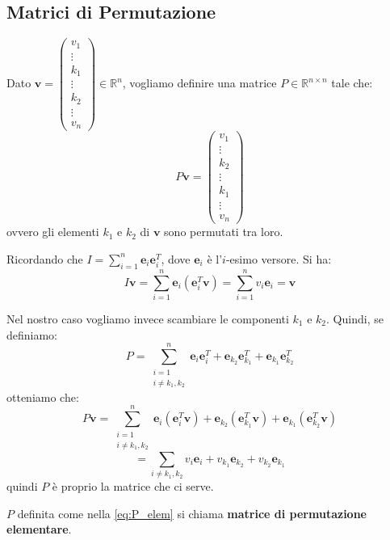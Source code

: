 \subsection{Matrici di Permutazione}
Dato $\mathbf{v} = \begin{pmatrix} v_1 \\ \vdots \\ k_1 \\ \vdots \\ k_2 \\ \vdots \\ v_n \end{pmatrix} \in \mathbb{R}^n$, vogliamo definire una matrice $P \in \mathbb{R}^{n \times n}$ tale che:
$$ P \mathbf{v} = \begin{pmatrix} v_1 \\ \vdots \\ k_2 \\ \vdots \\ k_1 \\ \vdots \\ v_n \end{pmatrix} $$
ovvero gli elementi $k_1$ e $k_2$ di $\mathbf{v}$ sono permutati tra loro.

Ricordando che $I = \sum_{i=1}^n \mathbf{e}_i \mathbf{e}_i^T$, dove $\mathbf{e}_i$ è l'$i$-esimo versore.
Si ha:
$$ I \mathbf{v} = \sum_{i=1}^n \mathbf{e}_i (\mathbf{e}_i^T \mathbf{v}) = \sum_{i=1}^n v_i \mathbf{e}_i = \mathbf{v} $$

Nel nostro caso vogliamo invece scambiare le componenti $k_1$ e $k_2$. Quindi, se definiamo:
\begin{equation} \label{eq:P_elem}
    P = \sum_{\substack{i=1 \\ i \neq k_1, k_2}}^n \mathbf{e}_i \mathbf{e}_i^T + \mathbf{e}_{k_2}\mathbf{e}_{k_1}^T + \mathbf{e}_{k_1}\mathbf{e}_{k_2}^T
\end{equation}
otteniamo che:
$$ P \mathbf{v} = \sum_{\substack{i=1 \\ i \neq k_1, k_2}}^n \mathbf{e}_i (\mathbf{e}_i^T \mathbf{v}) + \mathbf{e}_{k_2}(\mathbf{e}_{k_1}^T \mathbf{v}) + \mathbf{e}_{k_1}(\mathbf{e}_{k_2}^T \mathbf{v}) $$
$$ = \sum_{i \neq k_1, k_2} v_i \mathbf{e}_i + v_{k_1} \mathbf{e}_{k_2} + v_{k_2} \mathbf{e}_{k_1} $$
quindi $P$ è proprio la matrice che ci serve.

\begin{definition}
$P$ definita come nella \eqref{eq:P_elem} si chiama \textbf{matrice di permutazione elementare}.
\end{definition}

